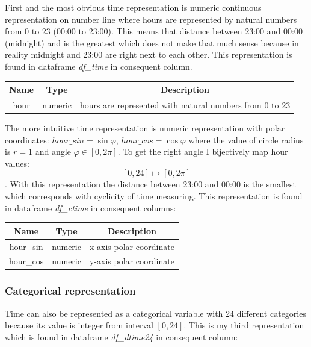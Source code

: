 \documentclass[12pt]{article}
\begin{document}
	First and the most obvious time representation is numeric continuous representation on number line where hours are represented by natural numbers from 0 to 23 (00:00 to 23:00). This means that distance between 23:00 and 00:00 (midnight) and is the greatest which does not make that much sense because in reality midnight and 23:00 are right next to each other. This representation is found in dataframe \textit{df\_time} in consequent column.
	
		\begin{center}
		\begin{tabular}{ |c|c|c| } 
			\hline
			\textbf{Name} & \textbf{Type} & \textbf{Description} \\ 
			\hline
			\hline
			hour & numeric & hours are represented with natural numbers from 0 to 23 \\ 
			\hline	
		\end{tabular}
	\end{center}

	
	The more intuitive time representation is numeric representation with polar coordinates: $hour\_sin = \sin \varphi $, $hour\_cos = \cos \varphi$ where the value of circle radius is $r=1$ and angle $\varphi \in  [0, 2\pi]$. To get the right angle I bijectively map hour values: $$ [0, 24] \mapsto [0, 2\pi]$$. With this representation the distance between 23:00 and 00:00 is the smallest which corresponds with cyclicity of time measuring. This representation is found in dataframe \textit{df\_ctime} in consequent columns: 
	
	\begin{center}
		\begin{tabular}{ |c|c|c| } 
			\hline
			\textbf{Name} & \textbf{Type} & \textbf{Description} \\ 
			\hline
			\hline
			hour\_sin & numeric & x-axis polar coordinate \\ 
			\hline	
			hour\_cos & numeric & y-axis polar coordinate \\ 
			\hline
		\end{tabular}
	\end{center}
	
	\subsubsection{Categorical representation}
	
	Time can also be represented as a categorical variable with 24 different categories because its value is integer from interval $[0, 24]$. This is my third representation which is found in dataframe \textit{df\_dtime24} in consequent column:  
	
\end{document}
